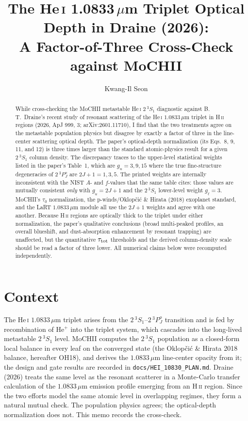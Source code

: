 \documentclass[english,a4paper]{my_memo}
\newcommand{\code}[1]{\texttt{#1}}
\newcommand{\HeI}{He\,\textsc{i}}
\newcommand{\HII}{H\,\textsc{ii}}
\newcommand{\tSSS}{2\,^3\!S_1}
\newcommand{\tPPP}{2\,^3\!P^o_J}
\newcommand{\tautot}{\tau_{\rm tot}}
\newcommand{\gl}{g_\ell}
\begin{document}
\title{The He\,\textsc{i} 1.0833\,$\mu$m Triplet Optical Depth in Draine (2026):\\
A Factor-of-Three Cross-Check against MoCHII}
\author{Kwang-Il Seon}
\date{\docmoddate}
\maketitle

\begin{abstract}
While cross-checking the MoCHII metastable \HeI{} $\tSSS$ diagnostic
against B.\,T.\ Draine's recent study of resonant scattering of the
\HeI{} $1.0833\,\mu$m triplet in \HII{} regions (2026, ApJ 999, 3;
arXiv:2601.11710), I find that the two treatments agree on the
metastable population physics but disagree by exactly a factor of three
in the line-center scattering optical depth.  The paper's optical-depth
normalization (its Eqs.~8, 9, 11, and 12) is three times larger than the
standard atomic-physics result for a given $\tSSS$ column density.  The
discrepancy traces to the upper-level statistical weights listed in the
paper's Table~1, which are $g_u = 3, 9, 15$ where the true fine-structure
degeneracies of $\tPPP$ are $2J+1 = 1, 3, 5$.  The printed weights are
internally inconsistent with the NIST $A$- and $f$-values that the same
table cites: those values are mutually consistent \emph{only} with
$g_u = 2J+1$ and the $\tSSS$ lower-level weight $\gl = 3$.  MoCHII's
$\tau_0$ normalization, the p-winds/Oklop\v{c}i\'c \& Hirata (2018)
exoplanet standard, and the LaRT $1.0833\,\mu$m module all use the
$2J+1$ weights and agree with one another.  Because \HII{} regions are
optically thick to the triplet under either normalization, the paper's
qualitative conclusions (broad multi-peaked profiles, an overall
blueshift, and dust-absorption enhancement by resonant trapping) are
unaffected, but the quantitative $\tautot$ thresholds and the derived
column-density scale should be read a factor of three lower.  All
numerical claims below were recomputed independently.
\end{abstract}

\section{Context}
The \HeI{} $1.0833\,\mu$m triplet arises from the $\tSSS$--$\tPPP$
transition and is fed by recombination of He$^+$ into the triplet system,
which cascades into the long-lived metastable $\tSSS$ level.  MoCHII
computes the $\tSSS$ population as a closed-form local balance in every
leaf on the converged state (the Oklop\v{c}i\'c \& Hirata 2018 balance,
hereafter OH18), and derives the $1.0833\,\mu$m line-center opacity from
it; the design and gate results are recorded in
\code{docs/HEI\_10830\_PLAN.md}.  Draine (2026) treats the same level as
the resonant scatterer in a Monte-Carlo transfer calculation of the
$1.0833\,\mu$m emission profile emerging from an \HII{} region.  Since the
two efforts model the same atomic level in overlapping regimes, they form
a natural mutual check.  The population physics agrees; the optical-depth
normalization does not.  This memo records the cross-check.
\end{document}
